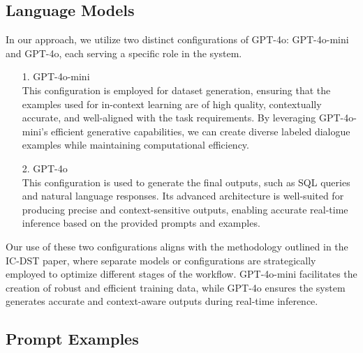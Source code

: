 \documentclass[conference]{IEEEtran}
\begin{document}
\subsection{Language Models}

In our approach, we utilize two distinct configurations of GPT-4o: GPT-4o-mini and GPT-4o, each serving a specific role in the system. \\ 

\begin{enumerate}
    \item[1.] GPT-4o-mini \\
    This configuration is employed for dataset generation, ensuring that the examples used for in-context learning are of high quality, contextually accurate, and well-aligned with the task requirements. By leveraging GPT-4o-mini's efficient generative capabilities, we can create diverse labeled dialogue examples while maintaining computational efficiency. \\ 

    \item[2.] GPT-4o \\
    This configuration is used to generate the final outputs, such as SQL queries and natural language responses. Its advanced architecture is well-suited for producing precise and context-sensitive outputs, enabling accurate real-time inference based on the provided prompts and examples. \\
    
\end{enumerate}

Our use of these two configurations aligns with the methodology outlined in the IC-DST paper, where separate models or configurations are strategically employed to optimize different stages of the workflow. GPT-4o-mini facilitates the creation of robust and efficient training data, while GPT-4o ensures the system generates accurate and context-aware outputs during real-time inference. \\ 

\subsection{Prompt Examples}


\end{document}
